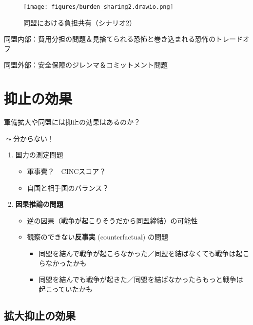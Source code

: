 \documentclass[
  xelatex,
  ja=standard]{bxjsarticle}
\providecommand{\tightlist}{%
  \setlength{\itemsep}{0pt}\setlength{\parskip}{0pt}}\usepackage{longtable,booktabs,array}
\begin{document}
\begin{figure}[htpb]

{\centering \texttt{[image: figures/burden\_sharing2.drawio.png]}

}

\caption{同盟における負担共有（シナリオ2）}

\end{figure}

同盟内部：費用分担の問題＆見捨てられる恐怖と巻き込まれる恐怖のトレードオフ

同盟外部：安全保障のジレンマ＆コミットメント問題

\hypertarget{ux6291ux6b62ux306eux52b9ux679c}{%
\section{抑止の効果}\label{ux6291ux6b62ux306eux52b9ux679c}}

軍備拡大や同盟には抑止の効果はあるのか？

\(\leadsto\)分からない！

\begin{enumerate}
\def\labelenumi{\arabic{enumi}.}
\tightlist
\item
  国力の測定問題

  \begin{itemize}
  \tightlist
  \item
    軍事費？　CINCスコア？
  \item
    自国と相手国のバランス？
  \end{itemize}
\item
  \textbf{因果推論の問題}

  \begin{itemize}
  \tightlist
  \item
    逆の因果（戦争が起こりそうだから同盟締結）の可能性
  \item
    観察のできない\textbf{反事実} (counterfactual) の問題

    \begin{itemize}
    \tightlist
    \item
      同盟を結んで戦争が起こらなかった／同盟を結ばなくても戦争は起こらなかったかも
    \item
      同盟を結んでも戦争が起きた／同盟を結ばなかったらもっと戦争は起こっていたかも
    \end{itemize}
  \end{itemize}
\end{enumerate}

\hypertarget{ux62e1ux5927ux6291ux6b62ux306eux52b9ux679c}{%
\subsection{拡大抑止の効果}\label{ux62e1ux5927ux6291ux6b62ux306eux52b9ux679c}}
\end{document}
